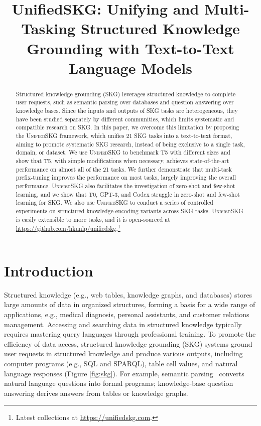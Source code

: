 \title{UnifiedSKG: Unifying and Multi-Tasking Structured Knowledge Grounding with Text-to-Text Language Models}

\begin{abstract}
Structured knowledge grounding (SKG) leverages structured knowledge to complete user requests, such as semantic parsing over databases and question answering over knowledge bases. Since the inputs and outputs of SKG tasks are heterogeneous, they have been studied separately by different communities, which limits systematic and compatible research on SKG. In this paper, we overcome this limitation by proposing the \textsc{Unified}SKG framework, which unifies 21 SKG tasks into a text-to-text format, aiming to promote systematic SKG research, instead of being exclusive to a single task, \mbox{domain}, or dataset. We use \textsc{Unified}SKG to benchmark T5 with different sizes and show that T5, with simple modifications when necessary, achieves state-of-the-art performance on almost all of the 21 tasks. We further demonstrate that multi-task prefix-tuning improves the performance on most tasks, largely improving the overall performance. 
\textsc{Unified}SKG also facilitates the investigation of zero-shot and few-shot learning, and we show that T0, GPT-3, and Codex struggle in zero-shot and few-shot learning for SKG. We also use \textsc{Unified}SKG to conduct a series of controlled experiments on structured knowledge encoding variants across SKG tasks. 
\textsc{Unified}SKG is easily extensible to more tasks, and it is open-sourced at \url{https://github.com/hkunlp/unifiedskg}.\footnote{Latest collections at \url{https://unifiedskg.com}.}
\end{abstract}

\section{Introduction}

Structured knowledge (e.g., web tables, knowledge graphs, and databases) stores large amounts of data in organized structures, forming a basis for a wide range of applications, e.g., medical diagnosis, personal assistants, and customer relations management. Accessing and searching data in structured knowledge typically requires mastering query languages through professional training. To promote the efficiency of data access, structured knowledge grounding (SKG) systems ground user requests in structured knowledge and produce various outputs, including computer programs (e.g., SQL and SPARQL), table cell values, and natural language responses (Figure \ref{fig:skg}). 
For example, semantic parsing~\cite{ZelleM96,Zettlemoyer05} converts natural language questions into formal programs; knowledge-base question answering \cite{BerantCFL13} derives answers from tables or knowledge graphs.

